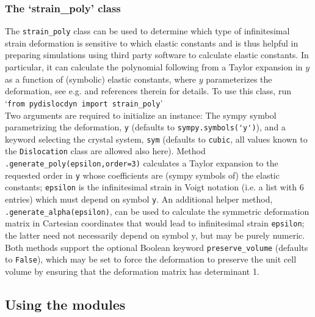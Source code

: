 \documentclass[11pt,letterpaper,oneside]{article}
\begin{document}
\subsubsection{The `strain\_poly' class}
\label{sec:strain_poly}

The \verb|strain_poly| class can be used to determine which type of infinitesimal strain deformation is sensitive to which elastic constants and is thus helpful in preparing simulations using third party software to calculate elastic constants.
In particular, it can calculate the polynomial following from a Taylor expansion in $y$ as a function of (symbolic) elastic constants, where $y$ parameterizes the deformation, see e.g. \cite{Gu:2019,Blaschke:2021temperature} and references therein for details.
To use this class, run
\\`\verb|from pydislocdyn import strain_poly|'\\
Two arguments are required to initialize an instance:
The sympy symbol parametrizing the deformation, \verb|y| (defaults to \verb|sympy.symbols('y')|), and a keyword selecting the crystal system, \verb|sym| (defaults to \verb|cubic|, all values known to the \verb|Dislocation| class are allowed also here).
Method \verb|.generate_poly(epsilon,order=3)| calculates a Taylor expansion to the requested order in \verb|y| whose coefficients are (sympy symbols of) the elastic constants; \verb|epsilon| is the infinitesimal strain in Voigt notation (i.e. a list with 6 entries) which must depend on symbol \verb|y|.
An additional helper method, \verb|.generate_alpha(epsilon)|, can be used to calculate the symmetric deformation matrix in Cartesian coordinates that would lead to infinitesimal strain \verb|epsilon|;
the latter need not necessarily depend on symbol y, but may be purely numeric.
Both methods support the optional Boolean keyword \verb|preserve_volume| (defaults to \verb|False|), which may be set to force the deformation to preserve the unit cell volume by ensuring that the deformation matrix has determinant 1.



\subsection{Using the modules}
\end{document}
